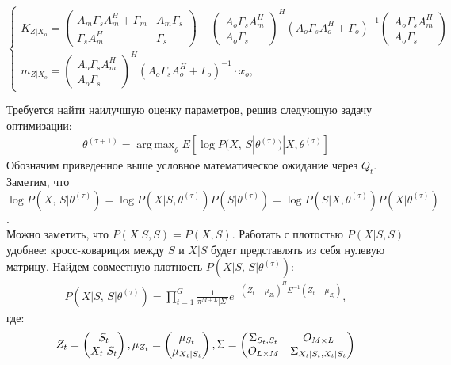 \documentclass[11pt]{article}
\DeclareMathOperator*{\argmax}{arg\,max}
\begin{document}
\begin{equation}
\left\{ \begin{gathered} 
K_{Z|X_o} = \begin{pmatrix}
A_m \Gamma_s A_m^H + \Gamma_m&A_m \Gamma_s\\
\Gamma_s A_m^H&\Gamma_s
\end{pmatrix}- \begin{pmatrix}
A_o\Gamma_s A_m^H\\
A_o\Gamma_s
\end{pmatrix}^H(A_o\Gamma_sA_o^H+\Gamma_o)^{-1} \begin{pmatrix}
A_o\Gamma_s A_m^H\\
A_o\Gamma_s
\end{pmatrix} \\
m_{Z|X_o} =   \begin{pmatrix}
A_o\Gamma_s A_m^H\\
A_o\Gamma_s
\end{pmatrix}^H(A_o\Gamma_sA_o^H+\Gamma_o)^{-1}\cdot x_o,
\end{gathered} \right.
\end{equation}
\begin{center}
\fontsize{16}{20}\selectfont {}
\end{center}
Требуется найти наилучшую оценку параметров, решив следующую задачу оптимизации:
\begin{gather}
\theta^{(\tau+1)}=\argmax_{\theta} E[\log P(X, \, S|\theta^{(\tau)})|X, \theta^{(\tau)}]
\end{gather}
Обозначим приведенное выше условное математическое ожидание через $Q_t$. 
Заметим, что \\ $\log P(X, \, S|\theta^{(\tau)}) = \log P(X|S,\theta^{(\tau)})P(S|\theta^{(\tau)}) = \log P(S|X,\theta^{(\tau)})P(X|\theta^{(\tau)})$.\\
Можно заметить, что $P(X|S, S) = P(X, S)$. Работать с плотостью $P(X|S, S)$ удобнее: кросс-ковариция между $S$ и $X|S$ будет представлять из себя нулевую матрицу.
Найдем совместную плотность $P(X|S, \, S|\theta^{(\tau)})$:
\begin{gather}
P(X|S, \, S|\theta^{(\tau)}) = \prod_{t=1}^G \frac{1}{\pi^{M+L}|\Sigma|}e^{-(Z_t-\mu_{Z_t})^H\Sigma^{-1}(Z_t-\mu_{Z_t})},
\end{gather}
где:
\begin{equation*}
Z_t = \begin{pmatrix}
S_t\\
X_t|S_t
\end{pmatrix},
\mu_{Z_t} = \begin{pmatrix}
\mu_{S_t}\\
\mu_{X_t|S_t}
\end{pmatrix}\\,
\Sigma = 
\begin{pmatrix}
\Sigma_{S_t,S_t}&O_{M\times L}\\
O_{L\times M}&\Sigma_{X_t|S_t,X_t|S_t}
\end{pmatrix}
\end{equation*}
\end{document}

